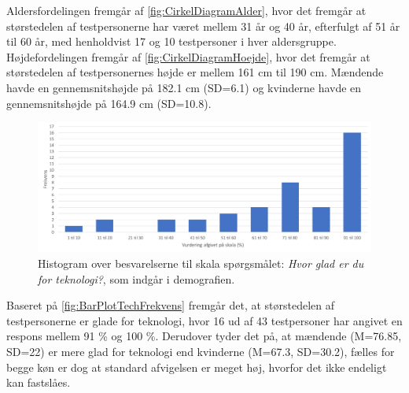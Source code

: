 \noindent
%
Aldersfordelingen fremgår af \autoref{fig:CirkelDiagramAlder}, hvor det fremgår at størstedelen af testpersonerne har været mellem 31 år og 40 år, efterfulgt af 51 år til 60 år, med henholdvist 17 og 10 testpersoner i hver aldersgruppe. Højdefordelingen fremgår af \autoref{fig:CirkelDiagramHoejde}, hvor det fremgår at størstedelen af testpersonernes højde er mellem 161 cm til 190 cm. Mændende havde en gennemsnitshøjde på 182.1 cm (SD=6.1) og kvinderne havde en gennemsnitshøjde på 164.9 cm (SD=10.8). 
%
\begin{figure}[H]
\centering
\includegraphics[width = \textwidth]{Figure/DatabehandlingSkalaer/TechFrekvens} 
\caption{Histogram over besvarelserne til skala spørgsmålet: \textit{Hvor glad er du for teknologi?}, som indgår i demografien.}
\label{fig:BarPlotTechFrekvens}
\end{figure}
\noindent
%
Baseret på \autoref{fig:BarPlotTechFrekvens} fremgår det, at størstedelen af testpersonerne er glade for teknologi, hvor 16 ud af 43 testpersoner har angivet en respons mellem 91 \% og 100 \%. Derudover tyder det på, at mændende (M=76.85, SD=22) er mere glad for teknologi end kvinderne (M=67.3, SD=30.2), fælles for begge køn er dog at standard afvigelsen er meget høj, hvorfor det ikke endeligt kan fastslåes. 
